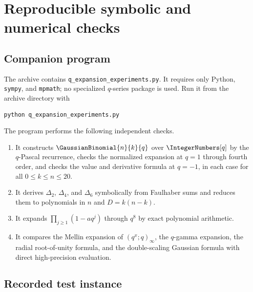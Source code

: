 \documentclass[11pt,oneside]{article}
\theoremstyle{definition}
\theoremstyle{remark}
\let\reporttopsection\section
\let\reportsubsection\subsection
\let\chapter\reporttopsection
\let\section\reportsubsection
\begin{document}
\chapter{Reproducible symbolic and numerical checks}\label{app:reproducibility}

\section{Companion program}

The archive contains \texttt{q\_expansion\_experiments.py}.  It requires only
Python, \texttt{sympy}, and \texttt{mpmath}; no specialized $q$-series package
is used.  Run it from the archive directory with
\begin{lstlisting}[style=pseudo]
python q_expansion_experiments.py
\end{lstlisting}
The program performs the following independent checks.

\begin{enumerate}[label=\textup{(\roman*)}]
\item It constructs $\GaussianBinomial{n}{k}{q}$ over $\IntegerNumbers[q]$ by the $q$-Pascal recurrence,
      checks the normalized expansion at $q=1$ through fourth order, and checks
      the value and derivative formula at $q=-1$, in each case for all
      $0\le k\le n\le20$.
\item It derives $\Delta_2$, $\Delta_4$, and $\Delta_6$ symbolically from
      Faulhaber sums and reduces them to polynomials in $n$ and
      $D=k(n-k)$.
\item It expands $\prod_{j\ge1}(1-aq^j)$ through $q^8$ by exact polynomial
      arithmetic.
\item It compares the Mellin expansion of $(q^x;q)_\infty$, the $q$-gamma
      expansion, the radial root-of-unity formula, and the double-scaling
      Gaussian formula with direct high-precision evaluation.
\end{enumerate}

\section{Recorded test instance}
\end{document}
